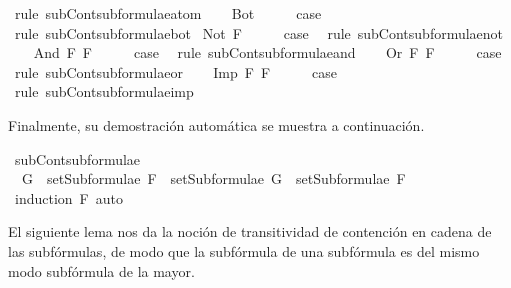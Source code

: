\begin{isabellebody}
\ {\isacharparenleft}rule\ subContsubformulae{\isacharunderscore}atom{\isacharparenright}\isanewline
{}\isamarkupfalse%
\isanewline
\ \ \isamarkupfalse%
\ Bot\isanewline
\ \ \isamarkupfalse%
\ \isamarkupfalse%
\ {\isacharquery}case\ \isamarkupfalse%
\ {\isacharparenleft}rule\ subContsubformulae{\isacharunderscore}bot{\isacharparenright}\isanewline
{}\isamarkupfalse%
\isanewline
{}\isamarkupfalse%
\ {\isacharparenleft}Not\ F{\isacharparenright}\isanewline
\ \ \isamarkupfalse%
\ \isamarkupfalse%
\ {\isacharquery}case\ \isamarkupfalse%
\ {\isacharparenleft}rule\ subContsubformulae{\isacharunderscore}not{\isacharparenright}\isanewline
{}\isamarkupfalse%
\isanewline
\ \ \isamarkupfalse%
\ {\isacharparenleft}And\ F{}\ F{}{\isacharparenright}\isanewline
\ \ \isamarkupfalse%
\ \isamarkupfalse%
\ {\isacharquery}case\ \isamarkupfalse%
\ {\isacharparenleft}rule\ subContsubformulae{\isacharunderscore}and{\isacharparenright}\isanewline
{}\isamarkupfalse%
\isanewline
\ \ \isamarkupfalse%
\ {\isacharparenleft}Or\ F{}\ F{}{\isacharparenright}\isanewline
\ \ \isamarkupfalse%
\ \isamarkupfalse%
\ {\isacharquery}case\ \isamarkupfalse%
\ {\isacharparenleft}rule\ subContsubformulae{\isacharunderscore}or{\isacharparenright}\isanewline
{}\isamarkupfalse%
\isanewline
\ \ \isamarkupfalse%
\ {\isacharparenleft}Imp\ F{}\ F{}{\isacharparenright}\isanewline
\ \ \isamarkupfalse%
\ \isamarkupfalse%
\ {\isacharquery}case\ \isamarkupfalse%
\ {\isacharparenleft}rule\ subContsubformulae{\isacharunderscore}imp{\isacharparenright}\isanewline
{}\isamarkupfalse%
%
\endisatagproof
{\isafoldproof}%
%
\isadelimproof
%
\endisadelimproof
%
\begin{isamarkuptext}%
Finalmente, su demostración automática se muestra a continuación.%
\end{isamarkuptext}\isamarkuptrue%
\isamarkupfalse%
\ subContsubformulae{\isacharcolon}\isanewline
\ \ {\isachardoublequoteopen}G\ {\isasymin}\ setSubformulae\ F\ {\isasymLongrightarrow}\ setSubformulae\ G\ {\isasymsubseteq}\ setSubformulae\ F{\isachardoublequoteclose}\isanewline
%
\isadelimproof
\ \ %
\endisadelimproof
%
\isatagproof
{}\isamarkupfalse%
\ {\isacharparenleft}induction\ F{\isacharparenright}\ auto%
\endisatagproof
{\isafoldproof}%
%
\isadelimproof
%
\endisadelimproof
%
\begin{isamarkuptext}%
El siguiente lema nos da la noción de transitividad de contención 
  en cadena de las subfórmulas, de modo que la subfórmula de una 
  subfórmula es del mismo modo subfórmula de la mayor.


\end{isamarkuptext}
\end{isabellebody}

